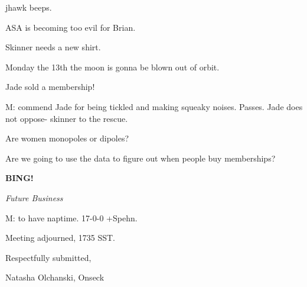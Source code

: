 \documentclass[12pt]{article}
\newcommand{\bing}{{\bf BING!} }
\newcommand{\goto}[1]{\bing \vskip 12pt \centerline{{\em{#1}}}}
\begin{document}
jhawk beeps.

ASA is becoming too evil for Brian.

Skinner needs a new shirt.

Monday the 13th the moon is gonna be blown out of orbit.

Jade sold a membership!

M: commend Jade for being tickled and making squeaky noises. Passes. Jade does not oppose- skinner to the rescue.

Are women monopoles or dipoles?

Are we going to use the data to figure out when people buy memberships?

\goto{Future Business}

M: to have naptime. 17-0-0 +Spehn.

\vspace{12pt}

\noindent
Meeting adjourned, 1735 SST.

\vspace{18pt}

\centerline{Respectfully submitted,}
\centerline{Natasha Olchanski, Onseck}
\end{document}
